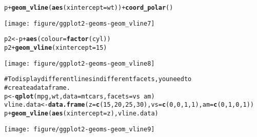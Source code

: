 \documentclass[a4paper,titlepage]{tufte-handout}\usepackage{graphicx, color}
\makeatletter
\def\maxwidth{ %
  \ifdim\Gin@nat@width>\linewidth
    \linewidth
  \else
    \Gin@nat@width
  \fi
}
\newcommand{\hlfunctioncall}[1]{\textcolor[rgb]{0.501960784313725,0,0.329411764705882}{\textbf{#1}}}%
\newcommand{\hlcomment}[1]{\textcolor[rgb]{0.180392156862745,0.6,0.341176470588235}{#1}}%
\newenvironment{kframe}{%
 \def\at@end@of@kframe{}%
 \ifinner\ifhmode%
  \def\at@end@of@kframe{\end{minipage}}%
  \begin{minipage}{\columnwidth}%
 \fi\fi%
 \def\FrameCommand##1{\hskip\@totalleftmargin \hskip-\fboxsep
 \colorbox{shadecolor}{##1}\hskip-\fboxsep
     \hskip-\linewidth \hskip-\@totalleftmargin \hskip\columnwidth}%
 \MakeFramed {\advance\hsize-\width
   \@totalleftmargin\z@ \linewidth\hsize
   \@setminipage}}%
 {\par\unskip\endMakeFramed%
 \at@end@of@kframe}
\newenvironment{knitrout}{}{} %
\makeatother
\begin{document}
\begin{knitrout}
\begin{kframe}
\begin{alltt}
p + \hlfunctioncall{geom_vline}(\hlfunctioncall{aes}(xintercept = wt)) + \hlfunctioncall{coord_polar}()
\end{alltt}
\end{kframe}\texttt{[image: figure/ggplot2-geoms-geom\_vline7]} \begin{kframe}\begin{alltt}
p2 <- p + \hlfunctioncall{aes}(colour = \hlfunctioncall{factor}(cyl))
p2 + \hlfunctioncall{geom_vline}(xintercept = 15)
\end{alltt}
\end{kframe}\texttt{[image: figure/ggplot2-geoms-geom\_vline8]} \begin{kframe}\begin{alltt}
\hlcomment{# To display different lines in different facets, you need to}
\hlcomment{# create a data frame.}
p <- \hlfunctioncall{qplot}(mpg, wt, data=mtcars, facets = vs ~ am)
vline.data <- \hlfunctioncall{data.frame}(z = \hlfunctioncall{c}(15, 20, 25, 30), vs = \hlfunctioncall{c}(0, 0, 1, 1), am = \hlfunctioncall{c}(0, 1, 0, 1))
p + \hlfunctioncall{geom_vline}(\hlfunctioncall{aes}(xintercept = z), vline.data)
\end{alltt}
\end{kframe}\texttt{[image: figure/ggplot2-geoms-geom\_vline9]} 
\end{knitrout}
\end{document}
